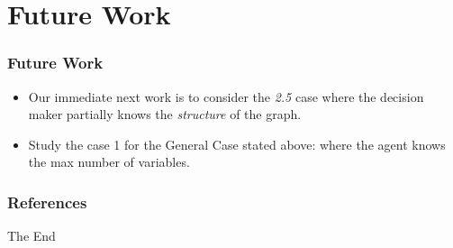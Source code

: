 \documentclass{beamer}
\theoremstyle{plain}
\begin{document}
\section{Future Work}
\begin{frame}
\frametitle{Future Work}
\begin{itemize}
\item Our immediate next work is to consider the \textit{2.5} case where the decision maker partially knows the \textit{structure} of the graph.
\item Study the case 1 for the General Case stated above: where the agent knows the max number of variables. 
\end{itemize}
\end{frame}


\begin{frame}[allowframebreaks]
\frametitle{References}


\end{frame}


\begin{frame}
\Huge{\centerline{The End}}
\end{frame}

\end{document}
